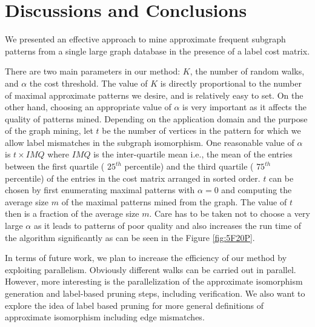 \section{Discussions and Conclusions}
\label{sec:conclusions}

We presented an effective approach to mine approximate frequent subgraph
patterns from a single large graph database in the presence of
a label cost matrix.

There are two main parameters in our method: $K$, the number of random
walks, and $\alpha$ the cost threshold. The value of $K$ is directly
proportional to the number of maximal approximate patterns we desire,
and is relatively easy to set.
On the other hand, choosing an appropriate value of
$\alpha$ is very important as it affects the quality of
patterns mined. Depending on the application domain
and the purpose of the graph mining, let $t$ be the number of
vertices in the pattern for which we allow label mismatches
in the subgraph isomorphism. One reasonable value of
$\alpha$ is $t \times IMQ$ where $IMQ$ is the inter-quartile mean
i.e., the mean of the entries between the first quartile ( $25^{th}$
percentile) and the third quartile ( $75^{th}$ percentile)
of the entries in the cost matrix arranged in sorted order. 
$t$ can be chosen by first
enumerating maximal patterns with $\alpha = 0$ and computing the 
average size $m$ of the maximal patterns mined from the graph.
The value of $t$ then is a fraction of the average size $m$.
Care has to be taken not to choose a very large $\alpha$ as it leads to
patterns of poor quality and also increases the run time of the
algorithm significantly as can be seen in the Figure \ref{fig:5F20P}.

In terms of future work, we plan to increase the efficiency of our
method by exploiting parallelism. Obviously different walks can be
carried out in parallel. However, more interesting is the
parallelization of the approximate isomorphism generation and
label-based pruning steps, including verification. We also
want to explore the idea of label based pruning for more
general definitions of approximate isomorphism including 
edge mismatches.

